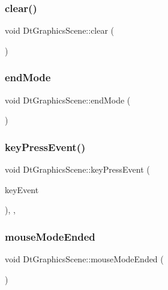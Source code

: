 \subsubsection{\texorpdfstring{clear()}{clear()}}
{\footnotesize\ttfamily void Dt\+Graphics\+Scene\+::clear (\begin{DoxyParamCaption}{ }\end{DoxyParamCaption})}

\mbox{\label{class_dt_graphics_scene_ae61bf9979e8470d74d08d0fea8dac739}} 
\subsubsection{\texorpdfstring{endMode}{endMode}}
{\footnotesize\ttfamily void Dt\+Graphics\+Scene\+::end\+Mode (\begin{DoxyParamCaption}{ }\end{DoxyParamCaption})\hspace{0.3cm}{\ttfamily [slot]}}

\mbox{\label{class_dt_graphics_scene_a68ed8c9c3767f39543a17c8879931787}} 
\subsubsection{\texorpdfstring{keyPressEvent()}{keyPressEvent()}}
{\footnotesize\ttfamily void Dt\+Graphics\+Scene\+::key\+Press\+Event (\begin{DoxyParamCaption}\item[{Q\+Key\+Event $\ast$}]{key\+Event }\end{DoxyParamCaption})\hspace{0.3cm}{\ttfamily [override]}, {\ttfamily [protected]}, {\ttfamily [virtual]}}

\mbox{\label{class_dt_graphics_scene_a050d0c4a0b8516314f42ab4b5f3e0606}} 
\subsubsection{\texorpdfstring{mouseModeEnded}{mouseModeEnded}}
{\footnotesize\ttfamily void Dt\+Graphics\+Scene\+::mouse\+Mode\+Ended (\begin{DoxyParamCaption}{ }\end{DoxyParamCaption})\hspace{0.3cm}{\ttfamily [signal]}}

